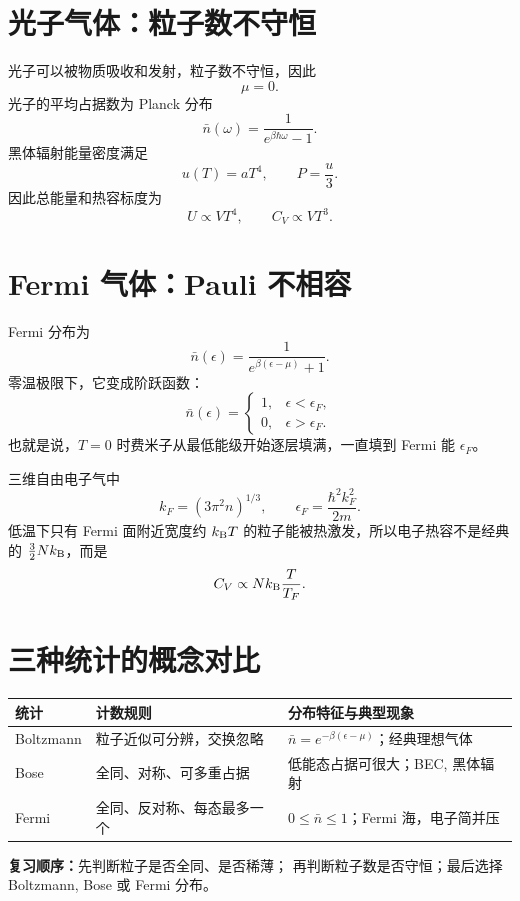 \section{光子气体：粒子数不守恒}

光子可以被物质吸收和发射，粒子数不守恒，因此
\[
  \mu=0.
\]
光子的平均占据数为 Planck 分布
\[
  \bar n(\omega)
  =
  \frac{1}{e^{\beta\hbar\omega}-1}.
\]
黑体辐射能量密度满足
\[
  u(T)=aT^4,\qquad P=\frac{u}{3}.
\]
因此总能量和热容标度为
\[
  U\propto VT^4,\qquad C_V\propto VT^3.
\]

\section{Fermi 气体：Pauli 不相容}

Fermi 分布为
\[
  \bar n(\epsilon)
  =
  \frac{1}{e^{\beta(\epsilon-\mu)}+1}.
\]
零温极限下，它变成阶跃函数：
\[
  \bar n(\epsilon)=
  \begin{cases}
    1, & \epsilon<\epsilon_F,\\
    0, & \epsilon>\epsilon_F.
  \end{cases}
\]
也就是说，$T=0$ 时费米子从最低能级开始逐层填满，一直填到 Fermi 能 $\epsilon_F$。

三维自由电子气中
\[
  k_F=(3\pi^2 n)^{1/3},
\qquad
  \epsilon_F=\frac{\hbar^2k_F^2}{2m}.
\]
低温下只有 Fermi 面附近宽度约 $k_{\mathrm B} T$ 的粒子能被热激发，所以电子热容不是经典的 $\frac{3}{2}Nk_{\mathrm B}$，而是
\[
  C_V\propto Nk_{\mathrm B} \frac{T}{T_F}.
\]

\section{三种统计的概念对比}

\begin{center}
\small
\begin{tabular}{p{} p{} p{}}
\toprule
统计 & 计数规则 & 分布特征与典型现象 \\
\midrule
Boltzmann & 粒子近似可分辨，交换忽略 & $\bar n=e^{-\beta(\epsilon-\mu)}$；经典理想气体 \\
Bose & 全同、对称、可多重占据 & 低能态占据可很大；BEC, 黑体辐射 \\
Fermi & 全同、反对称、每态最多一个 & $0\le\bar n\le1$；Fermi 海，电子简并压 \\
\bottomrule
\end{tabular}
\end{center}

\begin{keybox}
\textbf{复习顺序：}先判断粒子是否全同、是否稀薄；
再判断粒子数是否守恒；最后选择 Boltzmann, Bose 或 Fermi 分布。
\end{keybox}
